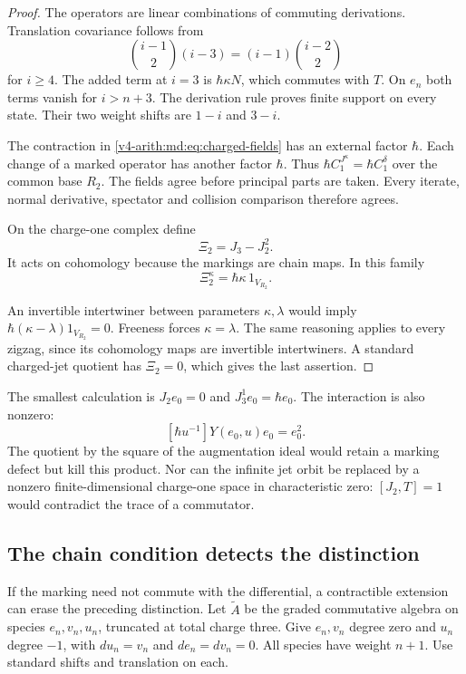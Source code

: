 \begin{proof}
The operators are linear combinations of commuting
derivations. Translation covariance follows from
\[
 \binom{i-1}{2}(i-3)=(i-1)\binom{i-2}{2}
\]
for $i\geq4$. The added term at $i=3$ is
$\hbar\kappa N$, which commutes with $T$.
On $e_n$ both terms vanish for $i>n+3$.
The derivation rule proves finite support on
every state. Their two weight shifts are
$1-i$ and $3-i$.

The contraction in
\eqref{v4-arith:md:eq:charged-fields} has an
external factor $\hbar$. Each change of a
marked operator has another factor $\hbar$.
Thus $\hbar C_1^{J^\kappa}=\hbar C_1^\delta$
over the common base $R_2$. The fields agree
before principal parts are taken.
Every iterate, normal derivative, spectator
and collision comparison therefore agrees.

On the charge-one complex define
\[
 \Xi_2=J_3-J_2^2.
\]
It acts on cohomology because the markings
are chain maps. In this family
\begin{equation}\label{v4-arith:md:eq:moment-defect}
 \Xi_2^\kappa=\hbar\kappa\,1_{V_{R_2}}.
\end{equation}

An invertible intertwiner between parameters
$\kappa,\lambda$ would imply
$\hbar(\kappa-\lambda)1_{V_{R_2}}=0$.
Freeness forces $\kappa=\lambda$.
The same reasoning applies to every zigzag,
since its cohomology maps are invertible
intertwiners. A standard charged-jet quotient
has $\Xi_2=0$, which gives the last assertion.
\end{proof}

The smallest calculation is $J_2e_0=0$ and
$J_3^1e_0=\hbar e_0$. The interaction is also
nonzero:
\[
 [\hbar u^{-1}]Y(e_0,u)e_0=e_0^2.
\]
The quotient by the square of the augmentation
ideal would retain a marking defect but kill
this product. Nor can the infinite jet orbit
be replaced by a nonzero finite-dimensional
charge-one space in characteristic zero:
$[J_2,T]=1$ would contradict the trace of a
commutator.

\subsection{The chain condition detects the distinction}

If the marking need not commute with the
differential, a contractible extension can
erase the preceding distinction.
Let $\widetilde A$ be the graded commutative
algebra on species $e_n,v_n,u_n$, truncated
at total charge three. Give $e_n,v_n$ degree
zero and $u_n$ degree $-1$, with
$du_n=v_n$ and $de_n=dv_n=0$.
All species have weight $n+1$.
Use standard shifts and translation on each.

